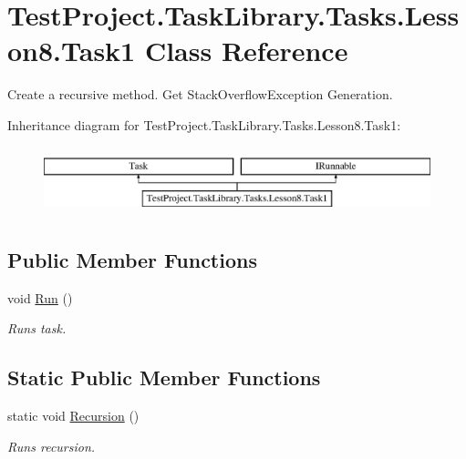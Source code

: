 \hypertarget{class_test_project_1_1_task_library_1_1_tasks_1_1_lesson8_1_1_task1}{}\section{Test\+Project.\+Task\+Library.\+Tasks.\+Lesson8.\+Task1 Class Reference}
\label{class_test_project_1_1_task_library_1_1_tasks_1_1_lesson8_1_1_task1}


Create a recursive method. Get Stack\+Overflow\+Exception Generation.  


Inheritance diagram for Test\+Project.\+Task\+Library.\+Tasks.\+Lesson8.\+Task1\+:\begin{figure}[H]
\begin{center}
\leavevmode
\includegraphics[height=2.000000cm]{class_test_project_1_1_task_library_1_1_tasks_1_1_lesson8_1_1_task1}
\end{center}
\end{figure}
\subsection*{Public Member Functions}
\begin{DoxyCompactItemize}
\item 
void \mbox{\hyperlink{class_test_project_1_1_task_library_1_1_tasks_1_1_lesson8_1_1_task1_a4ade97f465d174e9d0d47892f5e79d5f}{Run}} ()
\begin{DoxyCompactList}\small\item\em Runs task. \end{DoxyCompactList}\end{DoxyCompactItemize}
\subsection*{Static Public Member Functions}
\begin{DoxyCompactItemize}
\item 
static void \mbox{\hyperlink{class_test_project_1_1_task_library_1_1_tasks_1_1_lesson8_1_1_task1_a6adf7388679d5f260865e5bdb48b8770}{Recursion}} ()
\begin{DoxyCompactList}\small\item\em Runs recursion. \end{DoxyCompactList}\end{DoxyCompactItemize}


